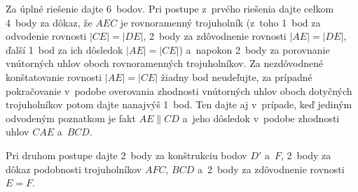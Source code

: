 {\nobreak\medskip\petit\noindent
Za úplné riešenie dajte 6~bodov. Pri postupe z~prvého riešenia dajte
celkom 4~body za dôkaz, že $AEC$ je rovnoramenný trojuholník (z~toho
1~bod za odvodenie rovnosti $|CE|=|DE|$,
2~body za zdôvodnenie rovnosti $|AE|=|DE|$, ďalší 1~bod
za ich dôsledok $|AE|=|CE|$) a~napokon 2~body za porovnanie
vnútorných uhlov oboch rovnoramenných trojuholníkov. Za nezdôvodnené
konštatovanie rovnosti $|AE|=|CE|$ žiadny bod neudeľujte,
za prípadné pokračovanie v~podobe overovania
zhodnosti vnútorných uhlov oboch dotyčných trojuholníkov potom dajte nanajvýš
1~bod. Ten dajte aj v~prípade, keď jediným odvodeným poznatkom je
fakt $AE\parallel CD$ a~jeho dôsledok v~podobe zhodnosti uhlov
$CAE$ a~$BCD$.

Pri druhom postupe dajte 2~body za konštrukciu bodov $D'$ a~$F$,
2~body za dôkaz podobnosti trojuholníkov $AFC$, $BCD$ a~2~body za
zdôvodnenie rovnosti $E=F$.

\endpetit
}

